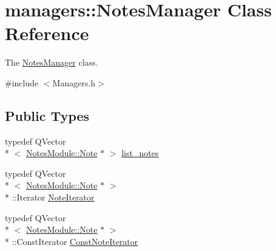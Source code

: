 \hypertarget{classmanagers_1_1_notes_manager}{\section{managers\-:\-:Notes\-Manager Class Reference}
\label{classmanagers_1_1_notes_manager}
}


The \hyperlink{classmanagers_1_1_notes_manager}{Notes\-Manager} class.  




{\ttfamily \#include $<$Managers.\-h$>$}

\subsection*{Public Types}
\begin{DoxyCompactItemize}
\item 
typedef Q\-Vector\\*
$<$ \hyperlink{class_notes_module_1_1_note}{Notes\-Module\-::\-Note} $\ast$ $>$ \hyperlink{classmanagers_1_1_notes_manager_a8db626da0db796108544d7bba0455d6e}{list\-\_\-notes}
\item 
typedef Q\-Vector\\*
$<$ \hyperlink{class_notes_module_1_1_note}{Notes\-Module\-::\-Note} $\ast$ $>$\\*
\-::Iterator \hyperlink{classmanagers_1_1_notes_manager_a5cc8bcf779f41be7de324080a7a4e80d}{Note\-Iterator}
\item 
typedef Q\-Vector\\*
$<$ \hyperlink{class_notes_module_1_1_note}{Notes\-Module\-::\-Note} $\ast$ $>$\\*
\-::Const\-Iterator \hyperlink{classmanagers_1_1_notes_manager_ac3a1b286533c5c0b96f0690e5a1ed5f6}{Const\-Note\-Iterator}
\end{DoxyCompactItemize}
